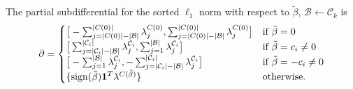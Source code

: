 \begin{theorem}
  \label{thm:cluster-subdifferential}
  The partial subdifferential for the sorted \(\ell_1\) norm with respect
  to \(\tilde\beta\), \(\mathcal{B} \gets \mathcal{C}_k\) is
  \[
    \partial =
    \begin{cases}
      \big[-\sum_{j=|C(0)|-|\mathcal{B}|}^{|C(0)|}\lambda^{C(0)}_j, \sum_{j=|C(0)|-|\mathcal{B}|}^{|C(0)|}\lambda^{C(0)}_j\big]                            & \text{if } \tilde\beta = 0           \\
      \big[\sum_{j=|\mathcal{C}_i| - |\mathcal{B}|}^{|\mathcal{C}_i|}\lambda^{\mathcal{C}_i}_j, \sum_{j=1}^{|\mathcal{B}|}\lambda^{\mathcal{C}_i}_j\big]   & \text{if } \tilde\beta = c_i \neq 0  \\
      \big[-\sum_{j=1}^{|\mathcal{B}|}\lambda^{\mathcal{C}_i}_j, -\sum_{j=|\mathcal{C}_i| - |\mathcal{B}|}^{|\mathcal{C}_i|}\lambda^{\mathcal{C}_i}_j\big] & \text{if } \tilde\beta = -c_i \neq 0 \\
      \{\operatorname{sign}(\tilde\beta)\boldsymbol{1}^T\lambda^{C(\tilde\beta)}\}                                                                                       & \text{otherwise.
      }
    \end{cases}
  \]
\end{theorem}
